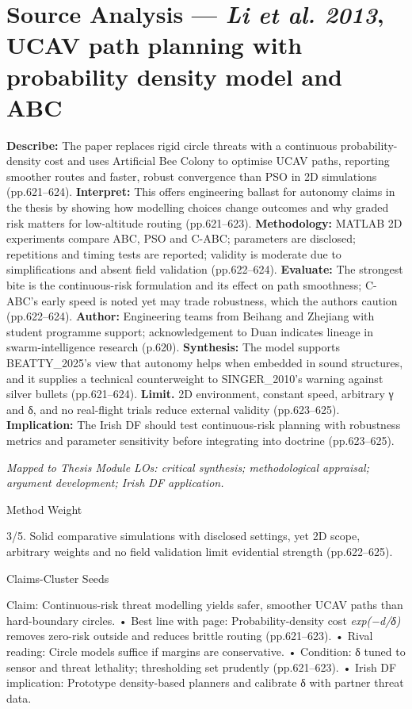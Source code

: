 \section*{Source Analysis — \textit{Li et al. 2013}, UCAV path planning with probability density model and ABC}
\textbf{Describe:} The paper replaces rigid circle threats with a continuous probability-density cost and uses Artificial Bee Colony to optimise UCAV paths, reporting smoother routes and faster, robust convergence than PSO in 2D simulations (pp.621–624).
\textbf{Interpret:} This offers engineering ballast for autonomy claims in the thesis by showing how modelling choices change outcomes and why graded risk matters for low-altitude routing (pp.621–623).
\textbf{Methodology:} MATLAB 2D experiments compare ABC, PSO and C-ABC; parameters are disclosed; repetitions and timing tests are reported; validity is moderate due to simplifications and absent field validation (pp.622–624).
\textbf{Evaluate:} The strongest bite is the continuous-risk formulation and its effect on path smoothness; C-ABC’s early speed is noted yet may trade robustness, which the authors caution (pp.622–624).
\textbf{Author:} Engineering teams from Beihang and Zhejiang with student programme support; acknowledgement to Duan indicates lineage in swarm-intelligence research (p.620).
\textbf{Synthesis:} The model supports BEATTY_2025’s view that autonomy helps when embedded in sound structures, and it supplies a technical counterweight to SINGER_2010’s warning against silver bullets (pp.621–624).
\textbf{Limit.} 2D environment, constant speed, arbitrary γ and δ, and no real-flight trials reduce external validity (pp.623–625). \textbf{Implication:} The Irish DF should test continuous-risk planning with robustness metrics and parameter sensitivity before integrating into doctrine (pp.623–625).

\textit{Mapped to Thesis Module LOs: critical synthesis; methodological appraisal; argument development; Irish DF application.}

Method Weight

3/5. Solid comparative simulations with disclosed settings, yet 2D scope, arbitrary weights and no field validation limit evidential strength (pp.622–625).

Claims-Cluster Seeds

Claim: Continuous-risk threat modelling yields safer, smoother UCAV paths than hard-boundary circles.
• Best line with page: Probability-density cost \emph{exp(−d/δ)} removes zero-risk outside and reduces brittle routing (pp.621–623).
• Rival reading: Circle models suffice if margins are conservative.
• Condition: δ tuned to sensor and threat lethality; thresholding set prudently (pp.621–623).
• Irish DF implication: Prototype density-based planners and calibrate δ with partner threat data.

